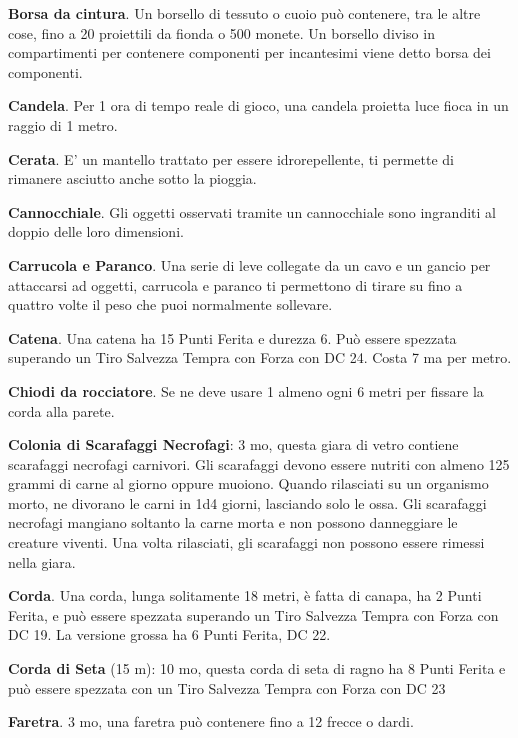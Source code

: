 \begin{multicols}{2}
\textbf{Borsa da cintura}. Un borsello di tessuto o cuoio può contenere, tra le altre cose, fino a 20 proiettili da fionda o 500 monete. Un borsello diviso in compartimenti per contenere componenti per incantesimi viene detto borsa dei componenti.

\textbf{Candela}\hypertarget{Candela}{}\label{Candela}. Per 1 ora di tempo reale di gioco, una candela proietta luce fioca in un raggio di 1 metro.

\textbf{Cerata}. E' un mantello trattato per essere idrorepellente, ti permette di rimanere asciutto anche sotto la pioggia.

\textbf{Cannocchiale}. Gli oggetti osservati tramite un cannocchiale sono ingranditi al doppio delle loro dimensioni.

\textbf{Carrucola e Paranco}. Una serie di leve collegate da un cavo e un gancio per attaccarsi ad oggetti, carrucola e paranco ti permettono di tirare su fino a quattro volte il peso che puoi normalmente sollevare.\label{Carrucola e Paranco}\hypertarget{Carrucola e paranco}{}

\textbf{Catena}\hypertarget{Catena}{}. Una catena ha 15 Punti Ferita e durezza 6. Può essere spezzata superando un Tiro Salvezza Tempra con Forza con DC 24. Costa 7 ma per metro.

\textbf{Chiodi da rocciatore}. Se ne deve usare 1 almeno ogni 6 metri per fissare la corda alla parete.

\textbf{Colonia di Scarafaggi Necrofagi}: 3 mo, questa giara di vetro contiene scarafaggi necrofagi carnivori. Gli scarafaggi devono essere nutriti con almeno 125 grammi di carne al giorno oppure muoiono. Quando rilasciati su un organismo morto, ne divorano le carni in 1d4 giorni, lasciando solo le ossa. Gli scarafaggi necrofagi mangiano soltanto la carne morta e non possono danneggiare le creature viventi. Una volta rilasciati, gli scarafaggi non possono essere rimessi nella giara.

\textbf{Corda}. Una corda, lunga solitamente 18 metri, è fatta di canapa, ha 2 Punti Ferita, e può essere spezzata superando un Tiro Salvezza Tempra con Forza con DC 19. La versione grossa ha 6 Punti Ferita, DC 22.\label{Corda}\hypertarget{Corda}{}

\textbf{Corda di Seta} (15 m): 10 mo, questa corda di seta di ragno ha 8 Punti Ferita e può essere spezzata con un Tiro Salvezza Tempra con Forza con DC 23

\textbf{Faretra}. 3 mo, una faretra può contenere fino a 12 frecce o dardi.\label{Faretra}\hypertarget{Faretra}{}


\end{multicols}
